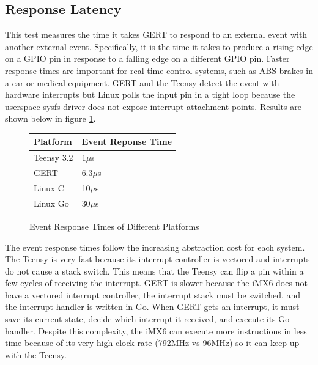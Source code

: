 
\subsection{Response Latency}\label{sec:int_time}
This test measures the time it takes GERT to respond to an external event
with another external event. Specifically, it is the time it takes to produce
a rising edge on a GPIO pin in response to a falling edge on a different GPIO pin.
Faster response times are important for real time control systems, such as ABS brakes
in a car or medical equipment.
GERT and the Teensy detect the event with hardware interrupts
but Linux polls the input pin in a tight loop because the userspace sysfs
driver does not expose interrupt attachment points.
Results are shown below in figure \ref{fig:RT}.

\begin{figure} [h]
\begin{center}
  \begin{tabular}{ | l | l |}
    \hline
    Platform & Event Reponse Time \\ \hline
    Teensy 3.2 & 1$\mu$s \\ \hline
    GERT & 6.3$\mu$s \\ \hline
    Linux C & 10$\mu$s \\ \hline
    Linux Go & 30$\mu$s \\
    \hline
  \end{tabular}
\end{center}
  \caption{Event Response Times of Different Platforms}  \label{fig:RT}
\end{figure}

The event response times follow the increasing abstraction cost for each system.
The Teensy is very fast because its interrupt controller is vectored and interrupts
do not cause a stack switch. This means that the Teensy can flip a pin within a few cycles
of receiving the interrupt. GERT is slower because the iMX6 does not have a
vectored interrupt controller, the interrupt stack must be switched, and the
interrupt handler is written in Go. When GERT gets an interrupt, it must save its
current state, decide which interrupt it received, and execute its Go handler. Despite this
complexity, the iMX6 can execute more instructions in less time because of its very
high clock rate (792MHz vs 96MHz) so it can keep up with the Teensy.

